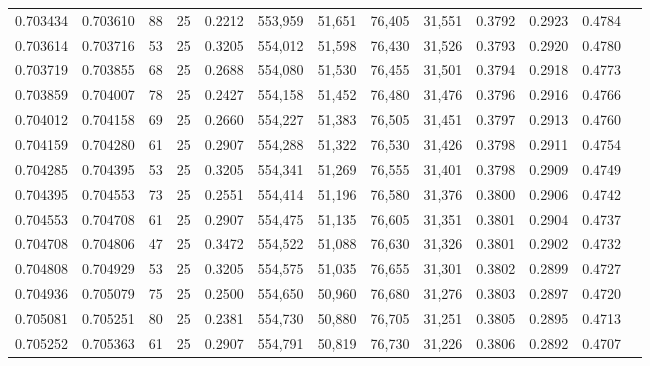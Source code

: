 \begin{tabular}{rrrrrrrrrrrrr}
0.703434 & 0.703610 &    88 &  25 &                                     0.2212 & 553,959 &  51,651 &  76,405 &  31,551 & 0.3792 & 0.2923 & 0.4784 \\
0.703614 & 0.703716 &    53 &  25 &                                     0.3205 & 554,012 &  51,598 &  76,430 &  31,526 & 0.3793 & 0.2920 & 0.4780 \\
0.703719 & 0.703855 &    68 &  25 &                                     0.2688 & 554,080 &  51,530 &  76,455 &  31,501 & 0.3794 & 0.2918 & 0.4773 \\
0.703859 & 0.704007 &    78 &  25 &                                     0.2427 & 554,158 &  51,452 &  76,480 &  31,476 & 0.3796 & 0.2916 & 0.4766 \\
0.704012 & 0.704158 &    69 &  25 &                                     0.2660 & 554,227 &  51,383 &  76,505 &  31,451 & 0.3797 & 0.2913 & 0.4760 \\
0.704159 & 0.704280 &    61 &  25 &                                     0.2907 & 554,288 &  51,322 &  76,530 &  31,426 & 0.3798 & 0.2911 & 0.4754 \\
0.704285 & 0.704395 &    53 &  25 &                                     0.3205 & 554,341 &  51,269 &  76,555 &  31,401 & 0.3798 & 0.2909 & 0.4749 \\
0.704395 & 0.704553 &    73 &  25 &                                     0.2551 & 554,414 &  51,196 &  76,580 &  31,376 & 0.3800 & 0.2906 & 0.4742 \\
0.704553 & 0.704708 &    61 &  25 &                                     0.2907 & 554,475 &  51,135 &  76,605 &  31,351 & 0.3801 & 0.2904 & 0.4737 \\
0.704708 & 0.704806 &    47 &  25 &                                     0.3472 & 554,522 &  51,088 &  76,630 &  31,326 & 0.3801 & 0.2902 & 0.4732 \\
0.704808 & 0.704929 &    53 &  25 &                                     0.3205 & 554,575 &  51,035 &  76,655 &  31,301 & 0.3802 & 0.2899 & 0.4727 \\
0.704936 & 0.705079 &    75 &  25 &                                     0.2500 & 554,650 &  50,960 &  76,680 &  31,276 & 0.3803 & 0.2897 & 0.4720 \\
0.705081 & 0.705251 &    80 &  25 &                                     0.2381 & 554,730 &  50,880 &  76,705 &  31,251 & 0.3805 & 0.2895 & 0.4713 \\
0.705252 & 0.705363 &    61 &  25 &                                     0.2907 & 554,791 &  50,819 &  76,730 &  31,226 & 0.3806 & 0.2892 & 0.4707 \\

\end{tabular}
